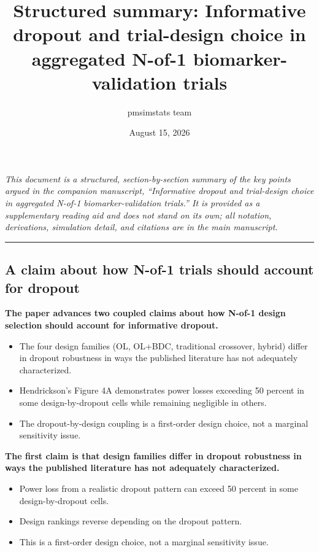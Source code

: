 \documentclass[
  11pt,
]{article}
\title{Structured summary: Informative dropout and trial-design choice in aggregated N-of-1 biomarker-validation trials}
\author{pmsimstats team}
\date{August 15, 2026}
\begin{document}
\maketitle

{
\setcounter{tocdepth}{2}
\tableofcontents
}
\emph{This document is a structured, section-by-section summary of the key points argued in the companion manuscript, ``Informative dropout and trial-design choice in aggregated N-of-1 biomarker-validation trials.'' It is provided as a supplementary reading aid and does not stand on its own; all notation, derivations, simulation detail, and citations are in the main manuscript.}

\bigskip\noindent

\rule{\textwidth}{0.4pt}\bigskip

\subsection{A claim about how N-of-1 trials should account for dropout}\label{a-claim-about-how-n-of-1-trials-should-account-for-dropout}

\textbf{The paper advances two coupled claims about how N-of-1 design selection should account for informative dropout.}

\begin{itemize}\setlength{\itemsep}{2pt}\setlength{\parskip}{0pt}
\item The four design families (OL, OL+BDC, traditional crossover, hybrid) differ in dropout robustness in ways the published literature has not adequately characterized.
\item Hendrickson's Figure 4A demonstrates power losses exceeding 50 percent in some design-by-dropout cells while remaining negligible in others.
\item The dropout-by-design coupling is a first-order design choice, not a marginal sensitivity issue.
\end{itemize}

\textbf{The first claim is that design families differ in dropout robustness in ways the published literature has not adequately characterized.}

\begin{itemize}\setlength{\itemsep}{2pt}\setlength{\parskip}{0pt}
\item Power loss from a realistic dropout pattern can exceed 50 percent in some design-by-dropout cells.
\item Design rankings reverse depending on the dropout pattern.
\item This is a first-order design choice, not a marginal sensitivity issue.
\end{itemize}
\end{document}
